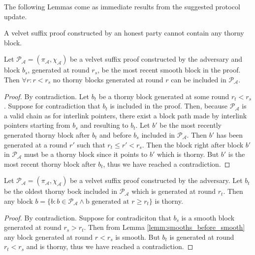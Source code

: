 The following Lemmas come as immediate results from the suggested protocol
update.

\begin{lemma}
	A velvet suffix proof constructed by an honest party cannot contain any thorny block.
	\label{lemm:smooth_honest_suffix}
\end{lemma}

\begin{lemma}
	Let $\mathcal{P_A} = (\pi_\mathcal{A}, \chi_\mathcal{A})$ be a velvet suffix proof constructed by the adversary and block $b_s$, generated at round $r_s$, be the most recent smooth block in the proof. Then $\forall r:r < r_s$ no thorny blocks generated at round $r$ can be included in $\mathcal{P_A}$.
	\label{lemm:smooths_before_smooth}
\end{lemma}
\begin{proof}
By contradiction. Let $b_t$ be a thorny block generated at some round $r_t < r_s$. Suppose for contradiction that $b_t$ is included in the proof. Then, because $\mathcal{P_A}$ is a valid chain as for interlink pointers, there exist a block path made by interlink pointers starting from $b_s$ and resulting to $b_t$. Let $b'$ be the most recently generated thorny block after $b_t$ and before $b_s$ included in $\mathcal{P_A}$. Then $b'$ has been generated at a round $r'$ such that $r_t \leq r' < r_s$. Then the block right after block $b'$ in $\mathcal{P_A}$ must be a thorny block since it points to $b'$ which is thorny. But $b'$ is the most recent thorny block after $b_t$, thus we have reached a contradiction.
\end{proof}

\begin{lemma}
	Let $\mathcal{P_A} = (\pi_\mathcal{A}, \chi_\mathcal{A})$ be a velvet suffix proof constructed by the adversary. Let $b_t$ be the oldest thorny bock included in $\mathcal{P_A}$ which is generated at round $r_t$. Then any block $b = \{b: b \in \mathcal{P_A} \wedge \text{b generated at }r \geq r_t \}$ is thorny.
	\label{lemm:thorny_after_thorny}
\end{lemma}
\begin{proof}
By contradiction. Suppose for contradiciton that $b_s$ is a smooth block generated at round $r_s > r_t$. Then from Lemma \ref{lemm:smooths_before_smooth} any block generated at round $r < r_s$ is smooth. But $b_t$ is generated at round $r_t < r_s$ and is thorny, thus we have reached a contradiction.
\end{proof}


